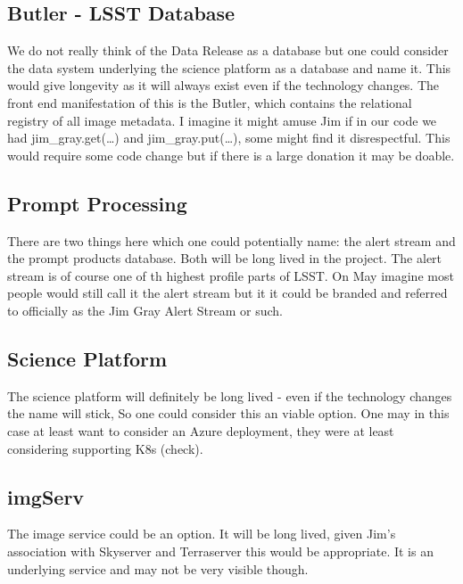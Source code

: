 \subsection{Butler - LSST Database}
We do not really think of the Data Release as a database but one could consider the data system underlying the science platform as a database and name it. This would give longevity as it will always exist even if the technology changes.
The front end manifestation of this is the Butler, which contains the relational registry of all image metadata.
I imagine it might amuse Jim if in our code we had jim\_gray.get(\ldots) and jim\_gray.put(\ldots), some might find it disrespectful.
 This would require some code change but if there is a large donation it may be doable.

\subsection{Prompt Processing}
There are two things here which one could potentially name: the alert stream and the prompt products database.
Both will be long lived in the project. The alert stream is of course one of th highest profile parts of LSST.
On May imagine most people would still call it the alert stream but it it could be branded and referred to officially as
the Jim Gray Alert Stream or such.

\subsection{Science Platform}
 The science platform will definitely be long lived - even if the technology changes the name will stick, So one could consider this an viable option. One may in this case at least want to consider an Azure deployment, they were at least considering supporting K8s (check).


\subsection{imgServ}
The image service could be an option. It will be long lived, given Jim's association with Skyserver and Terraserver this
would be appropriate. It is an underlying service and may not be very visible though.

